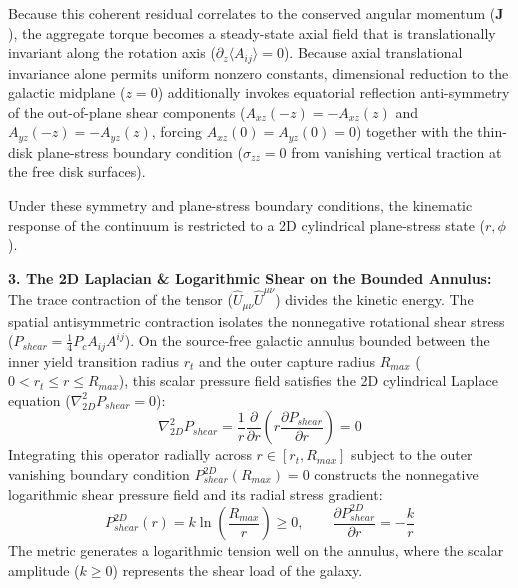 Because this coherent residual correlates to the conserved angular momentum ($\mathbf{J}$), the aggregate torque becomes a steady-state axial field that is translationally invariant along the rotation axis ($\partial_z \langle A_{ij} \rangle = 0$). Because axial translational invariance alone permits uniform nonzero constants, dimensional reduction to the galactic midplane ($z = 0$) additionally invokes equatorial reflection anti-symmetry of the out-of-plane shear components ($A_{xz}(-z) = -A_{xz}(z)$ and $A_{yz}(-z) = -A_{yz}(z)$, forcing $A_{xz}(0) = A_{yz}(0) = 0$) together with the thin-disk plane-stress boundary condition ($\sigma_{zz} = 0$ from vanishing vertical traction at the free disk surfaces). %

Under these symmetry and plane-stress boundary conditions, the kinematic response of the continuum is restricted to a 2D cylindrical plane-stress state ($r, \phi$). %

\vspace{0.2 cm}

\textbf{3. The 2D Laplacian \& Logarithmic Shear on the Bounded Annulus:} \\ %
The trace contraction of the tensor ($\hat{U}_{\mu\nu}\hat{U}^{\mu\nu}$) divides the kinetic energy. The spatial antisymmetric contraction isolates the nonnegative rotational shear stress ($P_{shear} = \frac{1}{4} P_c A_{ij}A^{ij}$).  On the source-free galactic annulus bounded between the inner yield transition radius $r_t$ and the outer capture radius $R_{max}$ ($0 < r_t \le r \le R_{max}$), this scalar pressure field satisfies the 2D cylindrical Laplace equation ($\nabla_{2D}^2 P_{shear} = 0$): %
\begin{equation}
    \nabla_{2D}^2 P_{shear} = \frac{1}{r} \frac{\partial}{\partial r} \left( r \frac{\partial P_{shear}}{\partial r} \right) = 0
\end{equation}
Integrating this operator radially across $r \in [r_t, R_{max}]$ subject to the outer vanishing boundary condition $P_{shear}^{2D}(R_{max}) = 0$ constructs the nonnegative logarithmic shear pressure field and its radial stress gradient: %
\begin{equation}
    P_{shear}^{2D}(r) = k \ln \left( \frac{R_{max}}{r} \right) \ge 0, \qquad \frac{\partial P_{shear}^{2D}}{\partial r} = -\frac{k}{r} \label{eq:logarithmic_shear_pressure} %
\end{equation}
The metric generates a logarithmic tension well on the annulus, where the scalar amplitude ($k \ge 0$) represents the shear load of the galaxy. %

